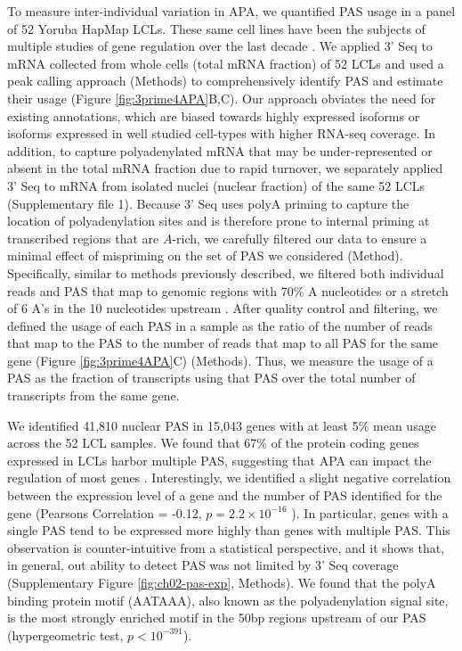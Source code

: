 To measure inter-individual variation in APA, we quantified PAS usage in a panel of 52 Yoruba HapMap LCLs. These same cell lines have been the subjects of multiple studies of gene regulation over the last decade \citep{degner_dnase_2012, mcvicker_identification_2013, li_rna_2016, pickrell_understanding_2010}. We applied 3' Seq to mRNA collected from whole cells (total mRNA fraction) of 52 LCLs and used a peak calling approach (Methods) to comprehensively identify PAS and estimate their usage (Figure \ref{fig:3prime4APA}B,C). Our approach obviates the need for existing annotations, which are biased towards highly expressed isoforms or isoforms expressed in well studied cell-types with higher RNA-seq coverage. In addition, to capture polyadenylated mRNA that may be under-represented or absent in the total mRNA fraction due to rapid turnover, we separately applied 3' Seq to mRNA from isolated nuclei (nuclear fraction) of the same 52 LCLs (Supplementary file 1). Because 3' Seq uses polyA priming to capture the location of polyadenylation sites and is therefore prone to internal priming at transcribed regions that are $A$-rich, we carefully filtered our data to ensure a minimal effect of mispriming on the set of PAS we considered (Method). Specifically, similar to methods previously described, we filtered both individual reads and PAS that map to genomic regions with 70\% A nucleotides or a stretch of 6 A's in the 10 nucleotides upstream \citep{sheppard_accurate_2013, tian_large-scale_2005}. After quality control and filtering, we defined the usage of each PAS in a sample as the ratio of the number of reads that map to the PAS to the number of reads that map to all PAS for the same gene (Figure \ref{fig:3prime4APA}C) (Methods). Thus, we measure the usage of a PAS as the fraction of transcripts using that PAS over the total number of transcripts from the same gene.


We identified 41,810 nuclear PAS in 15,043 genes with at least 5\% mean usage across the 52 LCL samples. We found that 67\% of the protein coding genes expressed in LCLs harbor multiple PAS, suggesting that APA can impact the regulation of most genes \citep{tian_alternative_2017,  mayr_evolution_2016, shi_alternative_2012}. Interestingly, we identified a slight negative correlation between the expression level of a gene and the number of PAS identified for the gene (Pearsons Correlation = -0.12, $p = 2.2 \times10^{-16}$ ). In particular, genes with a single PAS tend to be expressed more highly than genes with multiple PAS. This observation is counter-intuitive from a statistical perspective, and it shows that, in general, out ability to detect PAS was not limited by 3' Seq coverage (Supplementary Figure \ref{fig:ch02-pas-exp}, Methods). We found that the polyA binding protein motif (AATAAA), also known as the polyadenylation signal site, is the most strongly enriched motif in the 50bp regions upstream of our PAS (hypergeometric test, $p < 10^{-391}$).


